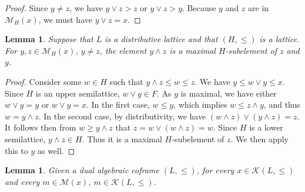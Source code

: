 \documentclass{article}
\newtheorem{lemma}[theorem]{Lemma}
\begin{document}
\begin{proof}
    Since $y \neq z$, we have $y \vee z > z$ or $y \vee z > y$. Because $y$ and $z$ are in $\mathcal{M}_H(x)$, we must have $y \vee z = x$.
\end{proof}

\begin{lemma}\label{lemma.max.of.max}
    Suppose that $L$ is a distributive lattice and that $(H,\le)$ is a lattice. For $y, z \in \mathcal{M}_H(x)$, $y \neq z$, the element $y \wedge z$ is a maximal $H$-subelement of $z$ and $y$.
\end{lemma}

\begin{proof}
    Consider some $w \in H$ such that $y \wedge z \le w \le z$. 
We have $y \le w \vee y \le x$. Since $H$ is an upper semilattice, 
$w \vee y \in F$. As $y$ is maximal, we have either $w \vee y = y$ or $w \vee y = x$. 
In the first case, $w \le y$, which implies $w \le z \wedge y$, and thus $w = y \wedge z$. 
In the second case, by distributivity, we have $(w \wedge z) \vee (y \wedge z) = z$. It follows then from $w \ge y \wedge z$ that $z = w \vee (w \wedge z) = w$. Since $H$ is a lower semilattice, $y \wedge z \in H$. Thus it is a maximal $H$-subelement of $z$. We then apply this to $y$ as well.
\end{proof}





\begin{lemma}
    {Given a dual algebraic coframe $(L,\le)$, for every $x \in \mathcal{K}(L,\le)$ and every $m \in \mathcal{M}(x)$, $m \in \mathcal{K}(L,\le)$.}
\end{lemma}
\end{document}

